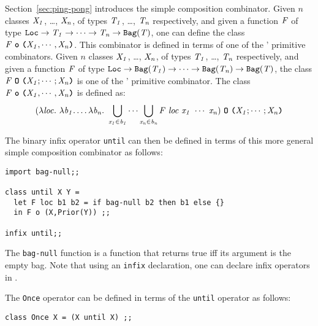 \documentclass[final]{article}
\begin{document}

Section~\ref{sec:ping-pong} introduces the simple composition
combinator.
Given $n$ classes $\mathit{X_1}$, \dots,
$\mathit{X_n}$, of types $\mathit{T_1}$, \dots, $\mathit{T_n}$
respectively, and given a function $\mathit{F}$ of type
%
$\NUPRLarrow
{\NUPRLloc}
{\NUPRLarrow
  {\NUPRL{T_1}}
  {\NUPRLarrow
    {\cdots}
    {\NUPRLarrow
      {\NUPRL{T_n}}
      {\NUPRLbag{\NUPRL{T}}}
    }
  }
}$,
%
one can define the class
$\mathit{F}\ \textbf{\texttt{o}}\ \textbf{\texttt{(}}\mathit{X_1},\cdots,\mathit{X_n}\textbf{\texttt{)}}$.
%
This combinator is defined in terms of one of the \logicE' primitive
combinators.
%
Given $n$ classes $\mathit{X_1}$, \dots,
$\mathit{X_n}$, of types $\mathit{T_1}$, \dots, $\mathit{T_n}$
respectively, and given a function $\mathit{F}$ of type
%
$\NUPRLarrow
{\NUPRLloc}
{\NUPRLarrow
  {\NUPRLbag{\NUPRL{T_1}}}
  {\NUPRLarrow
    {\cdots}
    {\NUPRLarrow
      {\NUPRLbag{\NUPRL{T_n}}}
      {\NUPRLbag{\NUPRL{T}}}
    }
  }
}$,
%
the class
$\mathit{F}\ \textbf{\texttt{O}}\ \textbf{\texttt{(}}\mathit{X_1};\cdots;\mathit{X_n}\textbf{\texttt{)}}$
is one of the \logicE' primitive combinator.
%
The class $\mathit{F}\ \textbf{\texttt{o}}\ \textbf{\texttt{(}}\mathit{X_1},\cdots,\mathit{X_n}\textbf{\texttt{)}}$
is defined as:
$$\NUPRLgensimplecombn
{(\NUPRLlam
  {\NUPRL{loc}}
  {\NUPRLlamn
    {\NUPRL{b_1}}
    {\NUPRL{b_n}}
    {\NUPRLbagcombinen
      {\NUPRL{b_1}}
      {\NUPRL{x_1}}
      {\NUPRL{b_n}}
      {\NUPRL{x_n}}
      {\NUPRLappn
        {\NUPRLapp{\NUPRL{F}}{\NUPRL{loc}}}
        {\NUPRL{x_1}}
        {\NUPRL{x_n}}
      }
    }
  })
}
{\NUPRL{X_1}}
{\NUPRL{X_n}}$$


The binary infix operator \lstinline{until} can then be defined in
terms of this more general simple composition combinator as follows:
\begin{emlcode}
\begin{lstlisting}
import bag-null;;

class until X Y =
  let F loc b1 b2 = if bag-null b2 then b1 else {}
  in F o (X,Prior(Y)) ;;

infix until;;
\end{lstlisting}
\end{emlcode}
The \lstinline{bag-null} function is a function that returns true iff
its argument is the empty bag.
%
Note that using an \lstinline{infix} declaration, one can declare infix
operators in \eml.


The \lstinline{Once} operator can be defined in terms of the
\lstinline{until} operator as follows:
\begin{emlcode}
\begin{lstlisting}
class Once X = (X until X) ;;
\end{lstlisting}
\end{emlcode}
\end{document}
